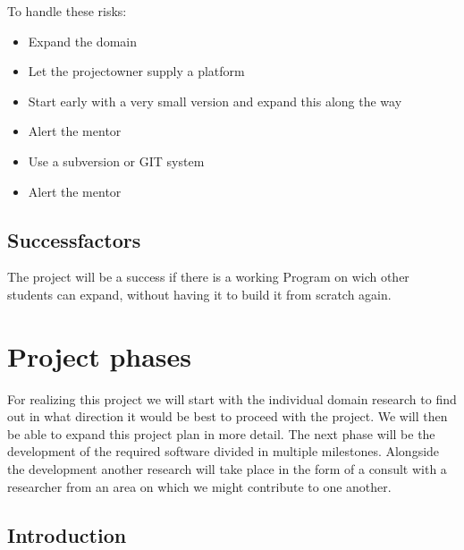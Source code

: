 \documentclass{article}
\begin{document}
\noindent To handle these risks:
\begin{itemize}
  \item Expand the domain
  \item Let the projectowner supply a platform
  \item Start early with  a very small version and expand this along the way
  \item Alert the mentor
  \item Use a subversion or GIT system
  \item Alert the mentor
\end{itemize}

\subsection{Successfactors}

The project will be a success if there is a working Program on wich other students can expand, without having it to build it from scratch again.

\section{Project phases}


For realizing this project we will start with the individual domain research to find out in what direction it would be best to proceed with the project. We will then be able to expand this project plan in more detail. The next phase will be the development of the required software divided in multiple milestones. Alongside the development another research will take place in the form of a consult with a researcher from an area on which we might contribute to one another.

\subsection{Introduction}

\end{document}
